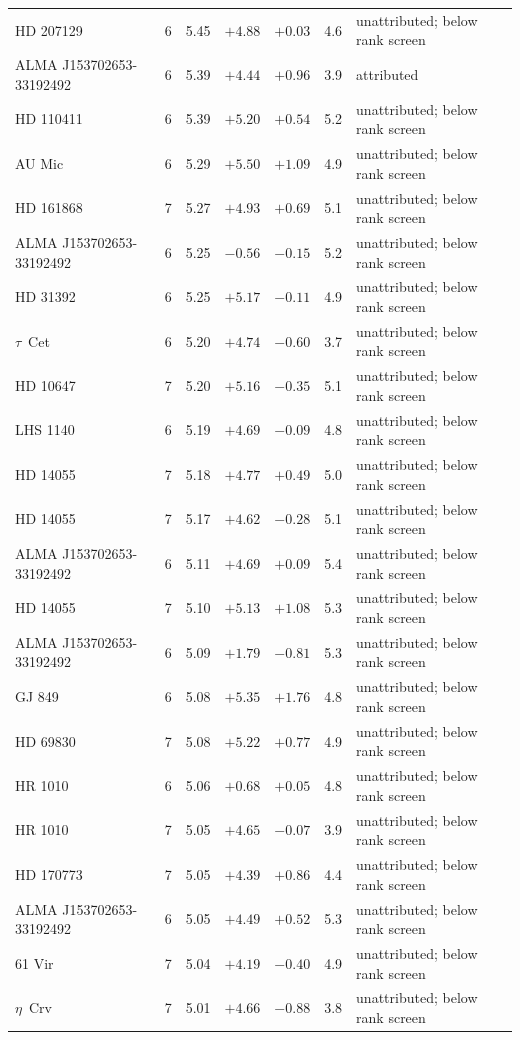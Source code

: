 \begin{tabular}{@{}llrrrrl@{}}
HD 207129 & 6 & 5.45 & $+4.88$ & $+0.03$ & 4.6 & unattributed; below rank screen \\
ALMA J153702653-33192492 & 6 & 5.39 & $+4.44$ & $+0.96$ & 3.9 & attributed \\
HD 110411 & 6 & 5.39 & $+5.20$ & $+0.54$ & 5.2 & unattributed; below rank screen \\
AU Mic & 6 & 5.29 & $+5.50$ & $+1.09$ & 4.9 & unattributed; below rank screen \\
HD 161868 & 7 & 5.27 & $+4.93$ & $+0.69$ & 5.1 & unattributed; below rank screen \\
ALMA J153702653-33192492 & 6 & 5.25 & $-0.56$ & $-0.15$ & 5.2 & unattributed; below rank screen \\
HD 31392 & 6 & 5.25 & $+5.17$ & $-0.11$ & 4.9 & unattributed; below rank screen \\
$\tau$~Cet & 6 & 5.20 & $+4.74$ & $-0.60$ & 3.7 & unattributed; below rank screen \\
HD 10647 & 7 & 5.20 & $+5.16$ & $-0.35$ & 5.1 & unattributed; below rank screen \\
LHS 1140 & 6 & 5.19 & $+4.69$ & $-0.09$ & 4.8 & unattributed; below rank screen \\
HD 14055 & 7 & 5.18 & $+4.77$ & $+0.49$ & 5.0 & unattributed; below rank screen \\
HD 14055 & 7 & 5.17 & $+4.62$ & $-0.28$ & 5.1 & unattributed; below rank screen \\
ALMA J153702653-33192492 & 6 & 5.11 & $+4.69$ & $+0.09$ & 5.4 & unattributed; below rank screen \\
HD 14055 & 7 & 5.10 & $+5.13$ & $+1.08$ & 5.3 & unattributed; below rank screen \\
ALMA J153702653-33192492 & 6 & 5.09 & $+1.79$ & $-0.81$ & 5.3 & unattributed; below rank screen \\
GJ 849 & 6 & 5.08 & $+5.35$ & $+1.76$ & 4.8 & unattributed; below rank screen \\
HD 69830 & 7 & 5.08 & $+5.22$ & $+0.77$ & 4.9 & unattributed; below rank screen \\
HR 1010 & 6 & 5.06 & $+0.68$ & $+0.05$ & 4.8 & unattributed; below rank screen \\
HR 1010 & 7 & 5.05 & $+4.65$ & $-0.07$ & 3.9 & unattributed; below rank screen \\
HD 170773 & 7 & 5.05 & $+4.39$ & $+0.86$ & 4.4 & unattributed; below rank screen \\
ALMA J153702653-33192492 & 6 & 5.05 & $+4.49$ & $+0.52$ & 5.3 & unattributed; below rank screen \\
61 Vir & 7 & 5.04 & $+4.19$ & $-0.40$ & 4.9 & unattributed; below rank screen \\
$\eta$~Crv & 7 & 5.01 & $+4.66$ & $-0.88$ & 3.8 & unattributed; below rank screen \\
\bottomrule
\end{tabular}
